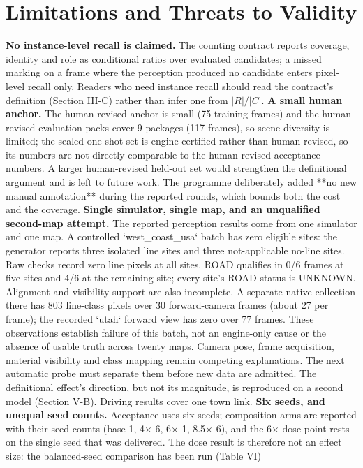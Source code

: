 \documentclass[journal]{IEEEtran}
\begin{document}
\section{Limitations and Threats to Validity}
\textbf{No instance-level recall is claimed.} The counting contract reports coverage, identity and role as
conditional ratios over evaluated candidates; a missed marking on a frame where the perception produced no
candidate enters pixel-level recall only. Readers who need instance recall should read the contract's
definition (Section III-C) rather than infer one from $|R|/|C|$.
\textbf{A small human anchor.} The human-revised anchor is small (75 training frames) and the human-revised evaluation packs
cover 9 packages (117 frames), so scene diversity is limited; the sealed one-shot set is engine-certified rather than
human-revised, so its numbers are not directly comparable to the human-revised acceptance numbers. A larger human-revised
held-out set would strengthen the definitional argument and is left to future work. The programme deliberately added **no
new manual annotation** during the reported rounds, which bounds both the cost and the coverage.
\textbf{Single simulator, single map, and an unqualified second-map attempt.} The reported perception
results come from one simulator and one map. A controlled `west_coast_usa` batch has zero eligible
sites: the generator reports three isolated line sites and three not-applicable no-line sites.
Raw checks record zero line pixels at all sites. ROAD qualifies in 0/6 frames at five sites and
4/6 at the remaining site; every site's ROAD status is UNKNOWN. Alignment and visibility support
are also incomplete. A separate native collection there has 803 line-class
pixels over 30 forward-camera frames (about 27 per frame); the recorded `utah` forward view has
zero over 77 frames. These observations establish failure of this batch, not an engine-only
cause or the absence of usable truth across twenty maps. Camera pose, frame acquisition, material
visibility and class mapping remain competing explanations. The next automatic probe must
separate them before new data are admitted. The definitional effect's direction, but not its
magnitude, is reproduced on a second model (Section V-B). Driving results cover one town link.
\textbf{Six seeds, and unequal seed counts.} Acceptance uses six seeds; composition arms are reported with their
seed counts (base 1, 4$\times$ 6, 6$\times$ 1, 8.5$\times$ 6), and the 6$\times$ dose point rests on the single seed that was delivered.
The dose result is therefore not an effect size: the balanced-seed comparison has been run (Table VI)
\end{document}
